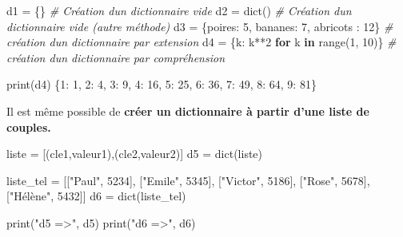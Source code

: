 \documentclass[
]{article}
\newenvironment{Shaded}{}{}
\newcommand{\BuiltInTok}[1]{#1}
\newcommand{\CommentTok}[1]{\textcolor[rgb]{0.38,0.63,0.69}{\textit{#1}}}
\newcommand{\ControlFlowTok}[1]{\textcolor[rgb]{0.00,0.44,0.13}{\textbf{#1}}}
\newcommand{\DecValTok}[1]{\textcolor[rgb]{0.25,0.63,0.44}{#1}}
\newcommand{\KeywordTok}[1]{\textcolor[rgb]{0.00,0.44,0.13}{\textbf{#1}}}
\newcommand{\NormalTok}[1]{#1}
\newcommand{\OperatorTok}[1]{\textcolor[rgb]{0.40,0.40,0.40}{#1}}
\newcommand{\StringTok}[1]{\textcolor[rgb]{0.25,0.44,0.63}{#1}}
\begin{document}
\begin{Shaded}
\begin{Highlighting}[]
\NormalTok{d1 }\OperatorTok{=}\NormalTok{ \{\}     }\CommentTok{\# Création d\textquotesingle{}un dictionnaire vide}
\NormalTok{d2 }\OperatorTok{=} \BuiltInTok{dict}\NormalTok{() }\CommentTok{\# Création d\textquotesingle{}un dictionnaire vide (autre méthode)}
\NormalTok{d3 }\OperatorTok{=}\NormalTok{ \{}\StringTok{\textquotesingle{}poires\textquotesingle{}}\NormalTok{: }\DecValTok{5}\NormalTok{, }\StringTok{\textquotesingle{}bananes\textquotesingle{}}\NormalTok{: }\DecValTok{7}\NormalTok{, }\StringTok{\textquotesingle{}abricots\textquotesingle{}}\NormalTok{ : }\DecValTok{12}\NormalTok{\} }\CommentTok{\# création d\textquotesingle{}un dictionnaire par extension}
\NormalTok{d4 }\OperatorTok{=}\NormalTok{ \{k: k}\OperatorTok{**}\DecValTok{2} \ControlFlowTok{for}\NormalTok{ k }\KeywordTok{in} \BuiltInTok{range}\NormalTok{(}\DecValTok{1}\NormalTok{, }\DecValTok{10}\NormalTok{)\} }\CommentTok{\# création d\textquotesingle{}un dictionnaire par compréhension}

\BuiltInTok{print}\NormalTok{(d4)}
\NormalTok{\{}\DecValTok{1}\NormalTok{: }\DecValTok{1}\NormalTok{, }\DecValTok{2}\NormalTok{: }\DecValTok{4}\NormalTok{, }\DecValTok{3}\NormalTok{: }\DecValTok{9}\NormalTok{, }\DecValTok{4}\NormalTok{: }\DecValTok{16}\NormalTok{, }\DecValTok{5}\NormalTok{: }\DecValTok{25}\NormalTok{, }\DecValTok{6}\NormalTok{: }\DecValTok{36}\NormalTok{, }\DecValTok{7}\NormalTok{: }\DecValTok{49}\NormalTok{, }\DecValTok{8}\NormalTok{: }\DecValTok{64}\NormalTok{, }\DecValTok{9}\NormalTok{: }\DecValTok{81}\NormalTok{\}}
\end{Highlighting}
\end{Shaded}

Il est même possible de \textbf{créer un dictionnaire à partir d'une
liste de couples.}

\begin{Shaded}
\begin{Highlighting}[]
\NormalTok{liste }\OperatorTok{=}\NormalTok{ [(}\StringTok{\textquotesingle{}cle1\textquotesingle{}}\NormalTok{,}\StringTok{\textquotesingle{}valeur1\textquotesingle{}}\NormalTok{),(}\StringTok{\textquotesingle{}cle2\textquotesingle{}}\NormalTok{,}\StringTok{\textquotesingle{}valeur2\textquotesingle{}}\NormalTok{)]}
\NormalTok{d5 }\OperatorTok{=} \BuiltInTok{dict}\NormalTok{(liste)}

\NormalTok{liste\_tel }\OperatorTok{=}\NormalTok{ [[}\StringTok{"Paul"}\NormalTok{, }\DecValTok{5234}\NormalTok{], [}\StringTok{"Emile"}\NormalTok{, }\DecValTok{5345}\NormalTok{], [}\StringTok{"Victor"}\NormalTok{, }\DecValTok{5186}\NormalTok{], [}\StringTok{"Rose"}\NormalTok{, }\DecValTok{5678}\NormalTok{], [}\StringTok{"Hélène"}\NormalTok{, }\DecValTok{5432}\NormalTok{]]}
\NormalTok{d6 }\OperatorTok{=} \BuiltInTok{dict}\NormalTok{(liste\_tel)}

\BuiltInTok{print}\NormalTok{(}\StringTok{"d5 =\textgreater{}"}\NormalTok{, d5)}
\BuiltInTok{print}\NormalTok{(}\StringTok{"d6 =\textgreater{}"}\NormalTok{, d6)}
\end{Highlighting}
\end{Shaded}
\end{document}
